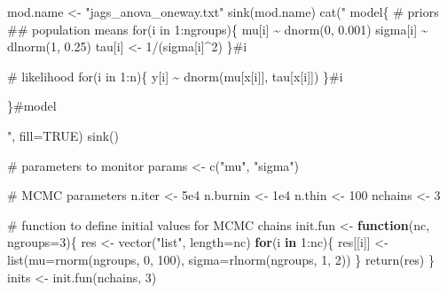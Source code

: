 \documentclass[
  13,
  letterpaper,
]{report}
\newenvironment{Shaded}{\begin{snugshade}}{\end{snugshade}}
\newcommand{\AttributeTok}[1]{\textcolor[rgb]{0.40,0.45,0.13}{#1}}
\newcommand{\CommentTok}[1]{\textcolor[rgb]{0.37,0.37,0.37}{#1}}
\newcommand{\ConstantTok}[1]{\textcolor[rgb]{0.56,0.35,0.01}{#1}}
\newcommand{\ControlFlowTok}[1]{\textcolor[rgb]{0.00,0.23,0.31}{\textbf{#1}}}
\newcommand{\DecValTok}[1]{\textcolor[rgb]{0.68,0.00,0.00}{#1}}
\newcommand{\FloatTok}[1]{\textcolor[rgb]{0.68,0.00,0.00}{#1}}
\newcommand{\FunctionTok}[1]{\textcolor[rgb]{0.28,0.35,0.67}{#1}}
\newcommand{\NormalTok}[1]{\textcolor[rgb]{0.00,0.23,0.31}{#1}}
\newcommand{\OtherTok}[1]{\textcolor[rgb]{0.00,0.23,0.31}{#1}}
\newcommand{\SpecialCharTok}[1]{\textcolor[rgb]{0.37,0.37,0.37}{#1}}
\newcommand{\StringTok}[1]{\textcolor[rgb]{0.13,0.47,0.30}{#1}}
\begin{document}
\begin{Shaded}
\begin{Highlighting}[]
\NormalTok{mod.name }\OtherTok{\textless{}{-}} \StringTok{"jags\_anova\_oneway.txt"}
\FunctionTok{sink}\NormalTok{(mod.name)}
\FunctionTok{cat}\NormalTok{(}\StringTok{"}
\StringTok{    model\{}
\StringTok{        \# priors}
\StringTok{        \#\# population means}
\StringTok{        for(i in 1:ngroups)\{}
\StringTok{            mu[i] \textasciitilde{} dnorm(0, 0.001)}
\StringTok{            sigma[i] \textasciitilde{} dlnorm(1, 0.25)}
\StringTok{            tau[i] \textless{}{-} 1/(sigma[i]\^{}2)}
\StringTok{        \}\#i}

\StringTok{        \# likelihood}
\StringTok{        for(i in 1:n)\{}
\StringTok{            y[i] \textasciitilde{} dnorm(mu[x[i]], tau[x[i]])}
\StringTok{        \}\#i}

\StringTok{    \}\#model}

\StringTok{"}\NormalTok{, }\AttributeTok{fill=}\ConstantTok{TRUE}\NormalTok{)}
\FunctionTok{sink}\NormalTok{()}

\CommentTok{\# parameters to monitor}
\NormalTok{params }\OtherTok{\textless{}{-}} \FunctionTok{c}\NormalTok{(}\StringTok{"mu"}\NormalTok{, }\StringTok{"sigma"}\NormalTok{)}

\CommentTok{\# MCMC parameters}
\NormalTok{n.iter }\OtherTok{\textless{}{-}} \FloatTok{5e4}
\NormalTok{n.burnin }\OtherTok{\textless{}{-}} \FloatTok{1e4}
\NormalTok{n.thin }\OtherTok{\textless{}{-}} \DecValTok{100}
\NormalTok{nchains }\OtherTok{\textless{}{-}} \DecValTok{3}

\CommentTok{\# function to define initial values for MCMC chains}
\NormalTok{init.fun }\OtherTok{\textless{}{-}} \ControlFlowTok{function}\NormalTok{(nc, }\AttributeTok{ngroups=}\DecValTok{3}\NormalTok{)\{}
\NormalTok{    res }\OtherTok{\textless{}{-}} \FunctionTok{vector}\NormalTok{(}\StringTok{"list"}\NormalTok{, }\AttributeTok{length=}\NormalTok{nc)}
    \ControlFlowTok{for}\NormalTok{(i }\ControlFlowTok{in} \DecValTok{1}\SpecialCharTok{:}\NormalTok{nc)\{}
\NormalTok{        res[[i]] }\OtherTok{\textless{}{-}} \FunctionTok{list}\NormalTok{(}\AttributeTok{mu=}\FunctionTok{rnorm}\NormalTok{(ngroups, }\DecValTok{0}\NormalTok{, }\DecValTok{100}\NormalTok{),}
                         \AttributeTok{sigma=}\FunctionTok{rlnorm}\NormalTok{(ngroups, }\DecValTok{1}\NormalTok{, }\DecValTok{2}\NormalTok{))}
\NormalTok{    \}}
    \FunctionTok{return}\NormalTok{(res)}
\NormalTok{\}}
\NormalTok{inits }\OtherTok{\textless{}{-}} \FunctionTok{init.fun}\NormalTok{(nchains, }\DecValTok{3}\NormalTok{)}


\end{Highlighting}
\end{Shaded}
\end{document}

